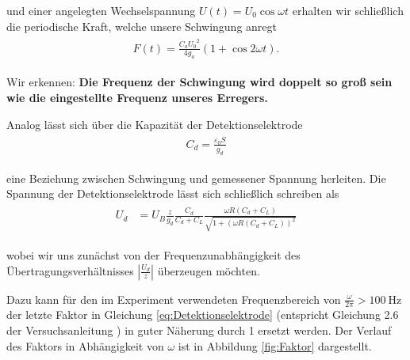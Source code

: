 und einer angelegten Wechselspannung $U(t) = U_0 \cos \omega t$ erhalten wir schließlich die periodische Kraft, welche unsere Schwingung anregt
\begin{align}
    \label{eq:PeriodischeKraft}
    \begin{split}
        F \left( t \right) = \frac{C_a {U_0}^2}{4 g_a} \left( 1 + \cos 2 \omega t \right).
    \end{split}
\end{align}

Wir erkennen: \textbf{Die Frequenz der Schwingung wird doppelt so groß sein wie die eingestellte Frequenz unseres Erregers.}

Analog lässt sich über die Kapazität der Detektionselektrode
\begin{align}
    \label{eq:KapazitaetDetektionselektrode}
    \begin{split}
        C_d = \frac{\varepsilon_0 S}{g_d}
    \end{split}
\end{align}

eine Beziehung zwischen Schwingung und gemessener Spannung herleiten.
Die Spannung der Detektionselektrode lässt sich schließlich schreiben als
\begin{align}
    \label{eq:Detektionselektrode}
    \begin{split}
        U_d &= U_B \frac{z}{g_d} \frac{C_d}{C_d + C_L} \frac{\omega R \left( C_d + C_L \right)}{\sqrt{1+\left( \omega R \left( C_d + C_L \right) \right)^2}}
    \end{split}
\end{align}

wobei wir uns zunächst von der Frequenzunabhängigkeit des Übertragungsverhältnisses $\left| \frac{U_d}{z} \right|$ überzeugen möchten.

Dazu kann für den im Experiment verwendeten Frequenzbereich von $\frac{\omega}{2\pi} > \SI{100}{\hertz}$ der letzte Faktor in Gleichung \ref{eq:Detektionselektrode} (entspricht Gleichung 2.6 der Versuchsanleitung \cite{Anleitung}) in guter Näherung durch \SI{1}{} ersetzt werden.
Der Verlauf des Faktors in Abhängigkeit von $\omega$ ist in Abbildung \ref{fig:Faktor} dargestellt.

